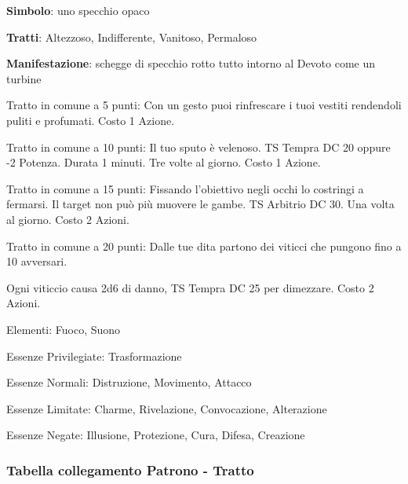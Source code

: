 \documentclass[a4paper,11pt,twoside,openany]{book}
\begin{document}
\textbf{Simbolo}: uno specchio opaco

\textbf{Tratti}: Altezzoso, Indifferente, Vanitoso, Permaloso

\textbf{Manifestazione}: schegge di specchio rotto tutto intorno al Devoto come un turbine

\bigskip

Tratto in comune a 5 punti: Con un gesto puoi rinfrescare i tuoi vestiti rendendoli puliti e profumati. Costo 1 Azione.

Tratto in comune a 10 punti: Il tuo sputo è velenoso. TS Tempra DC 20 oppure -2 Potenza. Durata 1 minuti. Tre volte al giorno. Costo 1 Azione.

Tratto in comune a 15 punti: Fissando l'obiettivo negli occhi lo costringi a fermarsi. Il target non può più muovere le gambe. TS Arbitrio DC 30. Una volta al giorno. Costo 2 Azioni.

Tratto in comune a 20 punti: Dalle tue dita partono dei viticci che pungono fino a 10 avversari.

Ogni viticcio causa 2d6 di danno, TS Tempra DC 25 per dimezzare. Costo 2 Azioni.

\bigskip

Elementi: Fuoco, Suono

\bigskip

Essenze Privilegiate: Trasformazione

Essenze Normali: Distruzione, Movimento, Attacco

Essenze Limitate: Charme, Rivelazione, Convocazione, Alterazione

Essenze Negate: Illusione, Protezione, Cura, Difesa, Creazione

\subsubsection{Tabella collegamento Patrono - Tratto}
\end{document}
